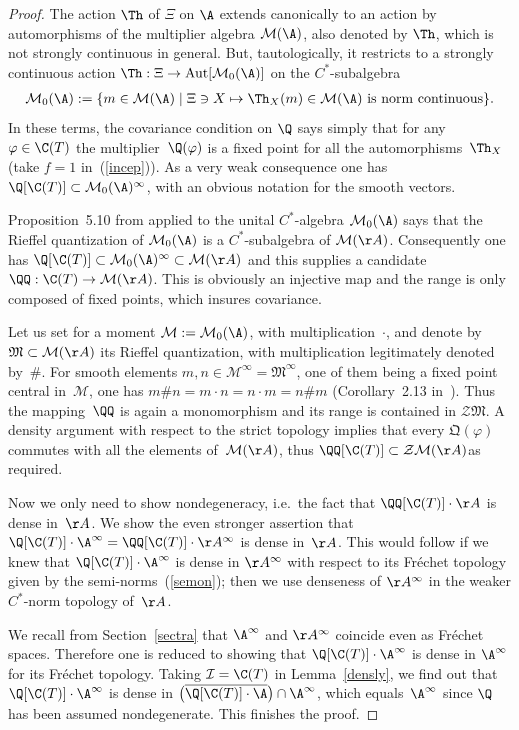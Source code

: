 \begin{proof}
The action $\Th$ of $\Xi$ on $\A$ extends canonically to an action by automorphisms of the multiplier algebra
$\mathcal M(\A)$, also denoted by $\Th$, which is not strongly continuous in general.
But, tautologically, it restricts to a strongly continuous action
$\Th:\Xi\rightarrow{\rm Aut}[\mathcal M_0(\A)]$ on the $C^*$-subalgebra
\begin{gather*}%
\mathcal M_0(\A):=\{m\in\mathcal M(\A)\mid\Xi\ni X\mapsto\Th_X(m)\in\mathcal M(\A)\ {\rm is\ norm\ continuous}\}.
\end{gather*}
In these terms, the covariance condition on $\Q$ says simply that for any $\varphi\in\C(T)$ the multip\-lier~$\Q(\varphi)$ is a f\/ixed point for all the automorphisms~$\Th_X$
(take $f=1$ in~(\ref{incep})). As a very weak consequence one has
$\Q[\C(T)]\subset\mathcal M_0(\A)^\infty$, with an obvious notation for the smooth vectors.

Proposition~5.10 from \cite{Rie1} applied to the unital $C^*$-algebra $\mathcal M_0(\A)$ says that the Rief\/fel quantization of
$\mathcal M_0(\A)$ is a $C^*$-subalgebra of $\mathcal M(\AA)$. Consequently one has $\Q[\C(T)]\subset\mathcal M_0(\A)^\infty
\subset\mathcal M(\AA)$ and this supplies a candidate $\QQ:\C(T)\rightarrow\mathcal M(\AA)$.
This is obviously an injective map and the range is only composed of f\/ixed points, which insures covariance.

Let us set for a moment $\mathcal M:=\mathcal M_0(\A)$, with multiplication~$\cdot$, and denote by
$\mathfrak M\subset\mathcal M(\AA)$ its Rief\/fel quantization, with multiplication legitimately denoted by~$\#$.
For smooth elements $m,n\in\mathcal M^\infty=\mathfrak M^\infty$, one of them being a f\/ixed point central in~$\mathcal M$,
one has $m\#n=m\cdot n=n\cdot m=n\#m$ (Corollary~2.13 in~\cite{Rie1}).
Thus the mapping~$\QQ$ is again a monomorphism and its range is contained in $\mathcal Z\mathfrak M$.
A density argument with respect to the strict topology implies that every $\mathfrak Q(\varphi)$
commutes with all the elements of~$\mathcal M(\AA)$, thus $\QQ[\C(T)]\subset\mathcal Z\mathcal M(\AA)$as required.

Now we only need to show nondegeneracy, i.e.\ the fact that $\QQ[\C(T)]\cdot\AA$ is dense in~$\AA$.
We show the even stronger assertion that $\Q[\C(T)]\cdot\A^\infty=\QQ[\C(T)]\cdot\AA^\infty$ is dense in~$\AA$.
This would follow if we knew that $\Q[\C(T)]\cdot\A^\infty$ is dense in $\AA^\infty$ with respect to its Fr\'echet topology
given by the semi-norms~(\ref{semon});
then we use denseness of $\AA^\infty$ in the weaker $C^*$-norm topology of~$\AA$.

We recall from Section~\ref{sectra} that $\A^\infty$ and $\AA^\infty$ coincide even as Fr\'echet spaces.
Therefore one is reduced to showing that $\Q[\C(T)]\cdot\A^\infty$ is dense in $\A^\infty$ for its Fr\'echet topology.
Taking $\mathcal I=\C(T)$ in Lemma~\ref{densly}, we f\/ind out that $\Q[\C(T)]\cdot\A^\infty$ is dense in
$\big(\overline{\Q[\C(T)]\cdot\A}\big)\cap\A^\infty$, which equals~$\A^\infty$ since $\Q$ has been assumed
nondegenerate. This f\/inishes the proof.
\end{proof}

